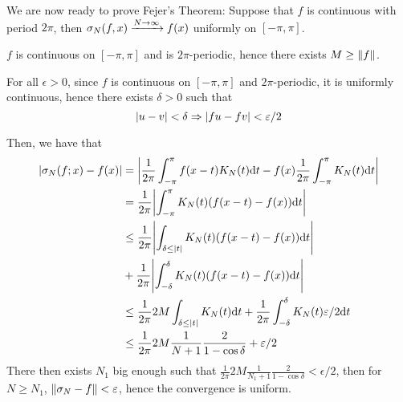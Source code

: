 \documentclass[a4paper, 12pt]{article}
\begin{document}
\begin{solution}
    We are now ready to prove Fejer's Theorem: Suppose that $f$ is continuous with period $2\pi$, then $\sigma_N(f, x) \xrightarrow{N \to \infty} f(x)$ uniformly on $[-\pi, \pi]$. 

    $f$ is continuous on $[-\pi, \pi]$ and is $2\pi$-periodic, hence there exists $M \geq \lVert f\rVert$.

    For all $\epsilon > 0$, since $f$ is continuous on $[-\pi, \pi]$ and $2\pi$-periodic, it is uniformly continuous, hence there exists $\delta > 0$ such that \begin{equation*}
    \lvert u -v\rvert < \delta \Rightarrow \lvert fu - fv\rvert < \varepsilon/2
    \end{equation*}

    Then, we have that \begin{align*}
        \abs*{\sigma_N(f; x) - f(x)} &= \abs*{\frac{1}{2\pi} \int_{-\pi}^{\pi} f(x-t) K_N(t) \dt - f(x) \frac{1}{2\pi} \int_{-\pi}^{\pi} K_N(t) \dt} \\
        &= \frac{1}{2\pi}   \abs*{\int_{-\pi}^{\pi} K_N(t) (f(x-t) - f(x)) \dt} \\
        &\leq \frac{1}{2\pi} \abs*{\int_{\delta \leq \abs{t}} K_N(t) (f(x-t) - f(x)) \dt} \\
        &+ \frac{1}{2\pi}\abs*{\int_{-\delta}^{\delta} K_N(t) (f(x-t) - f(x)) \dt} \\
        & \leq \frac{1}{2\pi} 2M \int_{\delta \leq \abs{t}} {K_N(t)} \dt + \frac{1}{2\pi} \int_{-\delta}^{\delta} K_N(t) \epsilon/2 \dt \\
        &\leq \frac{1}{2\pi} 2M \frac{1}{N+1} \frac{2}{1 - \cos \delta} + \epsilon/2
    \end{align*}
    There then exists $N_1$ big enough such that $\frac{1}{2\pi} 2M \frac{1}{N_1 + 1} \frac{2}{1 - \cos \delta} < \epsilon/2$, then for $N \geq N_1$, $\lVert\sigma_N - f\rVert < \varepsilon$, hence the convergence is uniform.
\end{solution}
\end{document}

